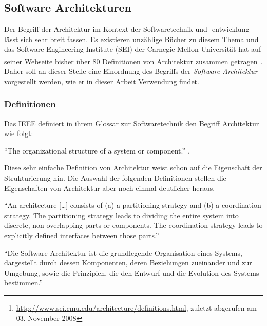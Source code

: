 \subsection{Software Architekturen} %
\label{sub:definition_software_architekturen}

  Der Begriff der Architektur im Kontext der Softwaretechnik und -entwicklung lässt sich sehr breit fassen. Es existieren unzählige Bücher zu diesem Thema und das Software Engineering Institute (SEI) der Carnegie Mellon Universität hat auf seiner Webseite bisher über 80 Definitionen von Architektur zusammen getragen\footnote{\url{http://www.sei.cmu.edu/architecture/definitions.html}, zuletzt abgerufen am 03. November 2008}. Daher soll an dieser Stelle eine Einordnung des Begriffs der \emph{Software Architektur} vorgestellt werden, wie er in dieser Arbeit Verwendung findet.
  
\subsubsection{Definitionen} %
\label{ssub:definitionen_architektur}

  Das IEEE definiert in ihrem Glossar zur Softwaretechnik den Begriff Architektur wie folgt:
  
  \begin{definition}\label{def:architektur_ieee}
    "`The organizational structure of a system or component."' \emph{\citep{ieee90sg}.}
  \end{definition}
  
  Diese sehr einfache Definition von Architektur weist schon auf die Eigenschaft der Strukturierung hin. Die Auswahl der folgenden Definitionen stellen die Eigenschaften von Architektur aber noch einmal deutlicher heraus.
  
  \begin{definition}\label{def:architektur_crispen}
    "`An architecture [\ldots] consists of (a) a partitioning strategy and (b) a coordination strategy. The partitioning strategy leads to dividing the entire system into discrete, non-overlapping parts or components. The coordination strategy leads to explicitly defined interfaces between those parts."' \emph{\citep[S. 272]{crispen1994sm}}
  \end{definition}
  
  \begin{definition}\label{def:architektur_reussner_et_al}
    "`Die Software-Architektur ist die grundlegende Organisation eines Systems, dargestellt durch dessen Komponenten, deren Beziehungen zueinander und zur Umgebung, sowie die Prinzipien, die den Entwurf und die Evolution des Systems bestimmen."' \emph{\citep[S. 1]{handbuch_der_software_architektur}}
  \end{definition}
  

